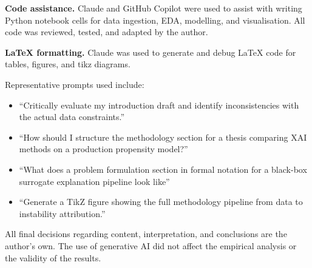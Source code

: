 \documentclass[oneside]{memoir} %
\begin{document}
\textbf{Code assistance.} Claude and GitHub Copilot were used to assist with writing Python notebook cells for data ingestion, EDA, modelling, and visualisation. All code was reviewed, tested, and adapted by the author.

\textbf{LaTeX formatting.} Claude was used to generate and debug LaTeX code for tables, figures, and tikz diagrams.

\noindent Representative prompts used include:

\begin{itemize}
\item ``Critically evaluate my introduction draft and identify inconsistencies with the actual data constraints.''
\item ``How should I structure the methodology section for a thesis comparing XAI methods on a production propensity model?''
\item ``What does a problem formulation section in formal notation for a black-box surrogate explanation pipeline look like''
\item ``Generate a TikZ figure showing the full methodology pipeline from data to instability attribution.''
\end{itemize}

All final decisions regarding content, interpretation, and conclusions are the author's own. The use of generative AI did not affect the empirical analysis or the validity of the results.
\end{document}
